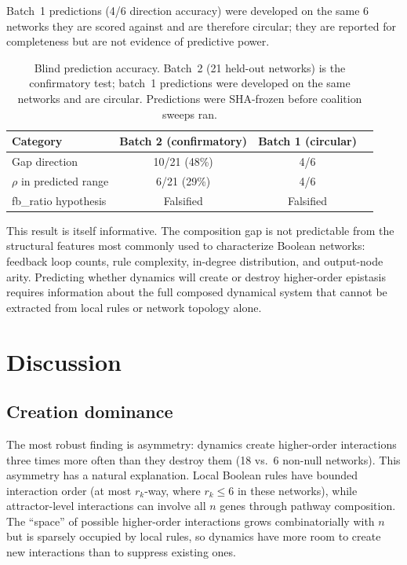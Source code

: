 \documentclass[11pt]{article}
\begin{document}
Batch~1 predictions (4/6 direction accuracy) were developed on the
same 6 networks they are scored against and are therefore circular;
they are reported for completeness but are not evidence of predictive
power.

\begin{table}[t]
\centering
\caption{Blind prediction accuracy. Batch~2 (21 held-out networks) is
the confirmatory test; batch~1 predictions were developed on the same
networks and are circular. Predictions were SHA-frozen before
coalition sweeps ran.}
\label{tab:blind}
\begin{tabular}{lccc}
\toprule
Category & Batch 2 (confirmatory) & Batch 1 (circular) \\
\midrule
Gap direction & 10/21 (48\%) & 4/6 \\
$\rho$ in predicted range & 6/21 (29\%) & 4/6 \\
fb\_ratio hypothesis & Falsified & Falsified \\
\bottomrule
\end{tabular}
\end{table}

This result is itself informative. The composition gap is not
predictable from the structural features most commonly used to
characterize Boolean networks: feedback loop counts, rule complexity,
in-degree distribution, and output-node arity. Predicting whether
dynamics will create or destroy higher-order epistasis requires
information about the full composed dynamical system that cannot be
extracted from local rules or network topology alone.


\section{Discussion}
\label{sec:discussion}

\subsection{Creation dominance}

The most robust finding is asymmetry: dynamics create higher-order
interactions three times more often than they destroy them (18 vs.\ 6
non-null networks). This asymmetry has a natural explanation. Local
Boolean rules have bounded interaction order (at most $r_k$-way,
where $r_k \leq 6$ in these networks), while attractor-level
interactions can involve all $n$ genes through pathway composition.
The ``space'' of possible higher-order interactions grows
combinatorially with $n$ but is sparsely occupied by local rules,
so dynamics have more room to create new interactions than to
suppress existing ones.
\end{document}
